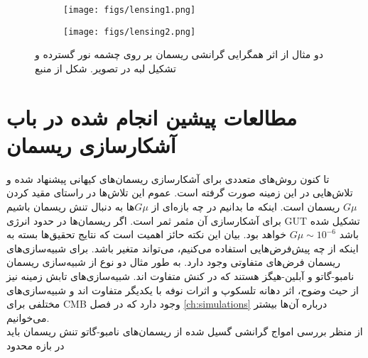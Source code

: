 \begin{figure}[h!]
	\centering
	\begin{subfigure}{.5\textwidth}
		\centering
		\texttt{[image: figs/lensing1.png]}
	\end{subfigure}%
	\begin{subfigure}{.5\textwidth}
		\centering
		\texttt{[image: figs/lensing2.png]}
	\end{subfigure}
	\caption{دو مثال از اثر همگرایی گرانشی ریسمان بر روی چشمه نور گسترده و تشکیل لبه در تصویر. شکل از منبع 
		\cite{sazhin2010gravitational}	
	}
	\label{fig:lensing}
\end{figure}

\section{مطالعات پیشین انجام شده در باب آشکارسازی ریسمان}
تا کنون روش‌های متعددی برای آشکارسازی ریسمان‌های کیهانی پیشنهاد شده و تلاش‌هایی در این زمینه صورت گرفته است. عموم این تلاش‌ها در راستای مقید کردن $G\mu$ ریسمان است. اینکه ما بدانیم در چه بازه‌ای از $G\mu$ها به دنبال تنش ریسمان باشیم برای آشکارسازی آن مثمر ثمر است. اگر ریسمان‌ها در حدود انرژی GUT تشکیل شده باشد
 $G\mu \sim 10^{-6}$
خواهد بود.
\cite{firouzjahi2005brane , kibble1976topology}    
بیان این نکته حائز اهمیت است که نتایج تحقیق‌ها بسته به اینکه از چه پیش‌فرض‌هایی استفاده می‌کنیم، می‌تواند متغیر باشد. برای شبیه‌سازی‌های ریسمان فرض‌های متفاوتی وجود دارد. به طور مثال دو نوع از شبیه‌سازی ریسمان نامبو-گاتو
\cite{fraisse2008small}
و آبلین-هیگز
\cite{moore2001evolution , bevis2007cmb}
هستند که در کنش متفاوت اند. شبیه‌سازی‌های تابش زمینه نیز از حیث وضوح، اثر دهانه تلسکوپ و اثرات نوفه با یکدیگر متفاوت اند و شبیه‌سازی‌های مختلفی برای CMB  وجود دارد که در فصل
\ref{ch:simulations} 
درباره آن‌ها بیشتر می‌خوانیم.
\\
از منظر بررسی امواج گرانشی گسیل شده از ریسمان‌های نامبو-گاتو تنش ریسمان باید در بازه محدود
 

